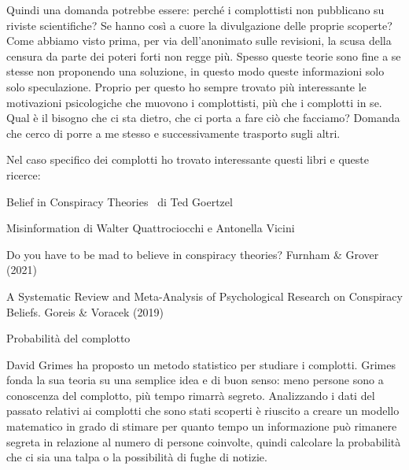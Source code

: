 \documentclass[12pt]{book} %
\begin{document}
\begin{mdframed}[linewidth=1pt]
\bigskip

Quindi una domanda potrebbe essere: perché i complottisti non pubblicano su riviste scientifiche? Se hanno così a cuore
la divulgazione delle proprie scoperte? Come abbiamo visto prima, per via dell'anonimato sulle
revisioni, la scusa della censura da parte dei poteri forti non regge più. Spesso queste teorie sono fine a se stesse
non proponendo una soluzione, in questo modo queste informazioni solo solo speculazione. Proprio per questo ho sempre
trovato più interessante le motivazioni psicologiche che muovono i complottisti, più che i complotti in se. Qual è il
bisogno che ci sta dietro, che ci porta a fare ciò che facciamo? Domanda che cerco di porre a me stesso e
successivamente trasporto sugli altri.


\bigskip

Nel caso specifico dei complotti ho trovato interessante questi libri e queste ricerce:

Belief in Conspiracy Theories \ di Ted Goertzel

Misinformation di Walter Quattrociocchi e Antonella Vicini

Do you have to be mad to believe in conspiracy theories? Furnham \& Grover
(2021)

A Systematic Review and Meta-Analysis of Psychological Research on Conspiracy Beliefs. Goreis \& Voracek
(2019) 


\bigskip

Probabilità del complotto

David Grimes ha proposto un metodo statistico per studiare i
complotti. Grimes fonda la sua
teoria su una semplice idea e di buon senso: meno persone sono a conoscenza del complotto, più tempo rimarrà segreto.
Analizzando i dati del passato relativi ai complotti che sono stati scoperti è riuscito a creare un modello matematico
in grado di stimare per quanto tempo un informazione può rimanere segreta in relazione al numero di persone coinvolte,
quindi calcolare la probabilità che ci sia una talpa o la possibilità di fughe di notizie.


\end{mdframed}
\end{document}
